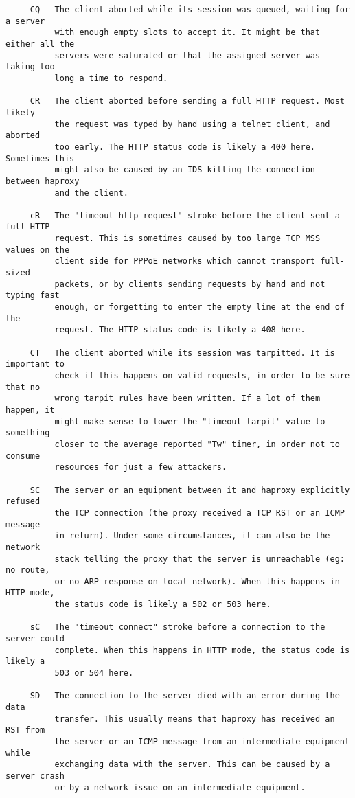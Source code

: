 \begin{verbatim}
     CQ   The client aborted while its session was queued, waiting for a server
          with enough empty slots to accept it. It might be that either all the
          servers were saturated or that the assigned server was taking too
          long a time to respond.

     CR   The client aborted before sending a full HTTP request. Most likely
          the request was typed by hand using a telnet client, and aborted
          too early. The HTTP status code is likely a 400 here. Sometimes this
          might also be caused by an IDS killing the connection between haproxy
          and the client.

     cR   The "timeout http-request" stroke before the client sent a full HTTP
          request. This is sometimes caused by too large TCP MSS values on the
          client side for PPPoE networks which cannot transport full-sized
          packets, or by clients sending requests by hand and not typing fast
          enough, or forgetting to enter the empty line at the end of the
          request. The HTTP status code is likely a 408 here.

     CT   The client aborted while its session was tarpitted. It is important to
          check if this happens on valid requests, in order to be sure that no
          wrong tarpit rules have been written. If a lot of them happen, it
          might make sense to lower the "timeout tarpit" value to something
          closer to the average reported "Tw" timer, in order not to consume
          resources for just a few attackers.

     SC   The server or an equipment between it and haproxy explicitly refused
          the TCP connection (the proxy received a TCP RST or an ICMP message
          in return). Under some circumstances, it can also be the network
          stack telling the proxy that the server is unreachable (eg: no route,
          or no ARP response on local network). When this happens in HTTP mode,
          the status code is likely a 502 or 503 here.

     sC   The "timeout connect" stroke before a connection to the server could
          complete. When this happens in HTTP mode, the status code is likely a
          503 or 504 here.

     SD   The connection to the server died with an error during the data
          transfer. This usually means that haproxy has received an RST from
          the server or an ICMP message from an intermediate equipment while
          exchanging data with the server. This can be caused by a server crash
          or by a network issue on an intermediate equipment.


\end{verbatim}
